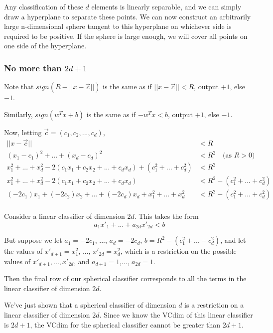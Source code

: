 \documentclass[]{article}
\begin{document}
Any classification of these $d$ elements is linearly separable, and we can simply draw a hyperplane to separate these points. We can now construct an arbitrarily large n-dimensional sphere tangent to this hyperplane on whichever side is required to be positive. If the sphere is large enough, we will cover all points on one side of the hyperplane.

\subsubsection{No more than $2d+1$}
Note that $sign(R-||x-\vec c||)$ is the same as if $||x-\vec c|| < R$, output $+1$, else $-1$.

Similarly, $sign(w^Tx+b)$ is the same as if $-w^Tx < b$, output $+1$, else $-1$.

Now, letting $\vec c = (c_1,c_2,...,c_d)$,
\begin{align*}
||x-\vec c|| &< R \\
(x_1-c_1)^2 + ... + (x_d-c_d)^2 &< R^2 \quad \text{(as $R > 0$)}\\
x_1^2 + ... + x_d^2 -2(c_1x_1 + c_2x_2 + ... + c_dx_d) + (c_1^2 + ... + c_d^2) &< R^2 \\
x_1^2 + ... + x_d^2 -2(c_1x_1 + c_2x_2 + ... + c_dx_d) &< R^2 - (c_1^2 + ... + c_d^2) \\
(-2c_1)x_1 + (-2c_2)x_2 + ... + (-2c_d)x_d + x_1^2 + ... + x_d^2 &< R^2 - (c_1^2 + ... + c_d^2) \\
\end{align*}

Consider a linear classifier of dimension $2d$. This takes the form
\[
a_1x'_1 + ... + a_{2d}x'_{2d} < b
\]

But suppose we let $a_1 = -2c_1$, ..., $a_d = -2c_d$, $b = R^2 - (c_1^2 + ... + c_d^2)$, and let the values of $x'_{d+1} = x_1^2$, ..., $x'_{2d} = x_d^2$, which is a restriction on the possible values of $x'_{d+1},...,x'_{2d}$, and $a_{d+1} = 1$,..., $a_{2d} = 1$.

Then the final row of our spherical classifier corresponds to all the terms in the linear classifier of dimension $2d$.

We've just shown that a spherical classifier of dimension $d$ is a restriction on a linear classifier of dimension $2d$. Since we know the VCdim of this linear classifier is $2d+1$, the VCdim for the spherical classifier cannot be greater than $2d+1$.
\end{document}
